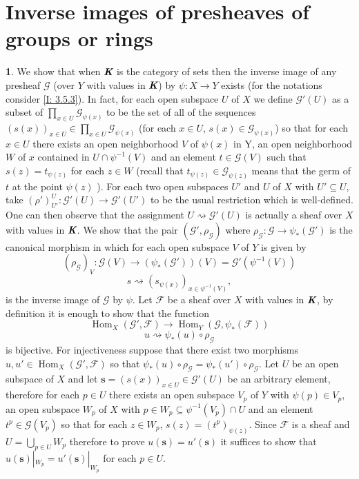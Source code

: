 \documentclass[12pt]{amsart}
\newcommand{\Hom}{\operatorname{Hom}}
\theoremstyle{definition}
\newtheorem{bk}[proposition]{}
\begin{document}
\section{Inverse images of presheaves of groups or rings}

\begin{bk}\label{I: 3.7.1} We show that when $\emph{\textbf{K}}$ is the category of sets then the inverse image of any presheaf $\mathscr{G}$ (over $Y$ with values in $\emph{\textbf{K}}$) by $\psi:X\rightarrow Y$ exists (for the notations consider \ref{I: 3.5.3}). In fact, for each open subspace $U$ of $X$ we define $\mathscr{G}'(U)$ as a subset of $\prod\limits_{x\in U}\mathscr{G}_{\psi(x)}$  to be the set of all of the sequences $( s(x) )_{x\in U}\in\prod\limits_{x\in U}\mathscr{G}_{\psi(x)}$ (for each $x\in U$, $s(x)\in\mathscr{G}_{\psi(x)}$) so that for each $x\in U$ there exists an open neighborhood $V$ of $\psi(x)$ in Y, an open neighborhood $W$ of $x$ contained in $U\cap\psi^{-1}(V)$ and an element $t\in\mathscr{G}(V)$ such that $s(z)=t_{\psi(z)}$ for each $z\in W$ (recall that $t_{\psi(z)}\in\mathscr{G}_{\psi(z)}$ means that the germ of $t$ at the point $\psi(z)$ ).
For each two open subspaces $U'$ and $U$ of $X$ with $U'\subseteq U$, take $(\rho')_{U'}^{U}:\mathscr{G}'(U)\rightarrow\mathscr{G}'(U')$ to be the usual restriction which is well-defined. One can then observe that the assignment $U\rightsquigarrow\mathscr{G}'(U)$ is actually a sheaf over $X$ with values in
$\emph{\textbf{K}}$. We show that the pair $(\mathscr{G}',\rho_{\mathcal{G}})$ where $\rho_{\mathcal{G}}:\mathscr{G}\rightarrow\psi_{\ast}(\mathscr{G}')$ is the canonical morphism in which for each open subspace $V$ of $Y$ is given by $$(\rho_{\mathcal{G}})_{V}:\mathscr{G}(V)
\rightarrow(\psi_{\ast}(\mathscr{G}'))(V)=\mathscr{G}'(\psi^{-1}(V))$$
$$s\rightsquigarrow(s_{\psi(x)})_{x\in\psi^{-1}(V)},$$ is the inverse image of $\mathscr{G}$ by $\psi$. Let $\mathscr{F}$ be a sheaf over $X$ with values in
$\emph{\textbf{K}}$, by definition it is enough to show that the function $$\Hom_{X}(\mathscr{G}',\mathscr{F})\rightarrow
\Hom_{Y}(\mathscr{G},\psi_{\ast}(\mathscr{F}))$$ $$u\rightsquigarrow\psi_{\ast}(u)\circ\rho_{\mathcal{G}}$$ is bijective. For injectiveness suppose that there exist two morphisms
$u, u'\in\Hom_{X}(\mathscr{G}',\mathscr{F})$ so that $\psi_{\ast}(u)\circ\rho_{\mathcal{G}}=\psi_{\ast}(u')\circ\rho_{\mathcal{G}}$. Let $U$ be an open subspace of $X$ and let $\textbf{s}=(s(x))_{x\in U}\in\mathscr{G}'(U)$ be an arbitrary element, therefore for each $p\in U$ there exists an open subspace $V_{p}$ of $Y$ with $\psi(p)\in V_{p}$, an open subspace $W_{p}$ of $X$ with $p\in W_{p}\subseteq\psi^{-1}(V_{p})\cap U$ and an element $t^{p}\in\mathscr{G}(V_{p})$ so that for each $z\in W_{p}$, $s(z)=(t^{p})_{\psi(z)}$. Since $\mathscr{F}$ is a sheaf and $U=\bigcup\limits_{p\in U}W_{p}$ therefore to prove $u(\textbf{s})=u'(\textbf{s})$ it suffices to show that  $u(\textbf{s})|_{W_{p}}=u'(\textbf{s})|_{W_{p}}$ for each $p\in U$.

\end{bk}
\end{document}
